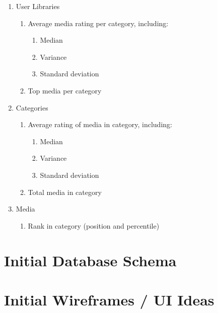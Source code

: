 \begin{enumerate}
  \item User Libraries
    \begin{enumerate}
      \item Average media rating per category, including:
        \begin{enumerate}
          \item Median
          \item Variance
          \item Standard deviation
        \end{enumerate}
      \item Top media per category
    \end{enumerate}
  \item Categories
    \begin{enumerate}
      \item Average rating of media in category, including:
        \begin{enumerate}
          \item Median
          \item Variance
          \item Standard deviation
        \end{enumerate}
      \item Total media in category
    \end{enumerate}
  \item Media
    \begin{enumerate}
      \item Rank in category (position and percentile)
    \end{enumerate}
\end{enumerate}

\section{Initial Database Schema}

\section{Initial Wireframes / UI Ideas}
